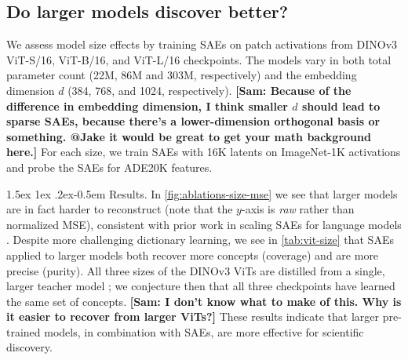\documentclass[10pt,twocolumn,letterpaper]{article}
\makeatletter
\newcommand{\todo}[1]{\textbf{\color{red}[TODO: #1]}}
\newcommand{\sam}[1]{\textbf{\color{blue}[Sam: #1]}}
\renewcommand{\paragraph}{%
  \@startsection{paragraph}{4}%
  {\z@}{1.5ex \@plus 1ex \@minus .2ex}{-0.5em}%
  {\normalfont\normalsize\bfseries}%
}
\makeatother
\begin{document}
% 



\subsection{Do larger models discover better?}
We assess model size effects by training SAEs on patch activations from DINOv3 ViT-S/16, ViT-B/16, and ViT-L/16 checkpoints.
The models vary in both total parameter count (22M, 86M and 303M, respectively) and the embedding dimension $d$ (\num{384}, \num{768}, and \num{1024}, respectively).
\sam{Because of the difference in embedding dimension, I think smaller $d$ should lead to sparse SAEs, because there's a lower-dimension orthogonal basis or something. @Jake it would be great to get your math background here.}
For each size, we train SAEs with 16K latents on ImageNet-1K activations and probe the SAEs for ADE20K features.

\paragraph{Results.}
In \cref{fig:ablations-size-mse} we see that larger models are in fact harder to reconstruct (note that the $y$-axis is \textit{raw} rather than normalized MSE), consistent with prior work in scaling SAEs for language models \citep{gao2025scaling}.
Despite more challenging dictionary learning, we see in \cref{tab:vit-size} that SAEs applied to larger models both recover more concepts (coverage) and are more precise (purity).
All three sizes of the DINOv3 ViTs are distilled from a single, larger teacher model \citep{simeoni2025dinov3}; we conjecture then that all three checkpoints have learned the same set of concepts.
\sam{I don't know what to make of this. Why is it easier to recover from larger ViTs?}
These results indicate that larger pre-trained models, in combination with SAEs, are more effective for scientific discovery.
\end{document}
